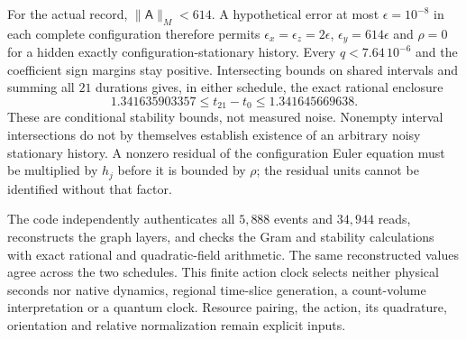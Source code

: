 For the actual record, $\|\mathsf A\|_M<614$. A hypothetical error at most
$\epsilon=10^{-8}$ in each complete configuration therefore permits
$\epsilon_x=\epsilon_z=2\epsilon$, $\epsilon_y=614\epsilon$ and
$\rho=0$ for a hidden exactly configuration-stationary history. Every
$q<7.64\,10^{-6}$ and the coefficient sign margins stay positive.
Intersecting bounds on shared intervals and summing all $21$ durations gives,
in either schedule, the exact rational enclosure
\[
 1.341635903357\le t_{21}-t_0\le1.341645669638.
\]
These are conditional stability bounds, not measured noise. Nonempty
interval intersections do not by themselves establish existence of an
arbitrary noisy stationary history. A nonzero residual of the configuration
Euler equation must be multiplied by $h_j$ before it is bounded by $\rho$;
the residual units cannot be identified without that factor.

The code independently authenticates all $5{,}888$ events and $34{,}944$
reads, reconstructs the graph layers, and checks the Gram and stability
calculations with exact rational and quadratic-field arithmetic. The same
reconstructed values agree across the two schedules. This finite action
clock selects neither physical seconds nor native dynamics, regional
time-slice generation, a count-volume interpretation or a quantum clock.
Resource pairing, the action, its quadrature, orientation and relative
normalization remain explicit inputs.
